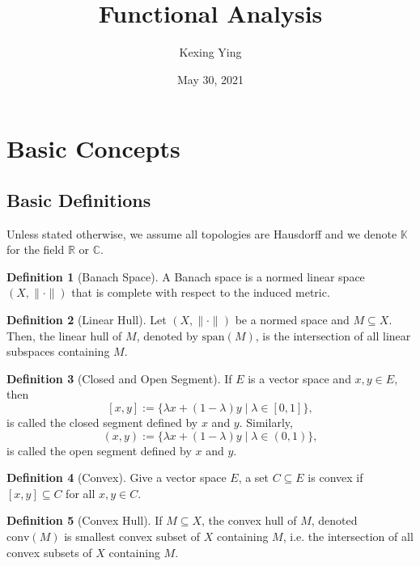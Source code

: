 \documentclass[
]{article}
\title{Functional Analysis}
\author{Kexing Ying}
\date{May 30, 2021}
\theoremstyle{definition}
\theoremstyle{definition}
\newtheorem{definition}{Definition}[section]
\begin{document}
\maketitle

{
\hypersetup{linkcolor=}
\setcounter{tocdepth}{2}
\tableofcontents
}
\newpage

\section{Basic Concepts}

\subsection{Basic Definitions}

Unless stated otherwise, we assume all topologies are Hausdorff and we denote 
\(\mathbb{K}\) for the field \(\mathbb{R}\) or \(\mathbb{C}\).

\begin{definition}[Banach Space]
  A Banach space is a normed linear space \((X, \|\cdot\|)\) that is complete 
  with respect to the induced metric.
\end{definition}

\begin{definition}[Linear Hull]
  Let \((X, \|\cdot\|)\) be a normed space and \(M \subseteq X\). Then, the 
  linear hull of \(M\), denoted by \(\text{span}(M)\), is the intersection of 
  all linear subspaces containing \(M\).
\end{definition}

\begin{definition}[Closed and Open Segment]
  If \(E\) is a vector space and \(x, y \in E\), then 
  \[[x, y] := \{\lambda x + (1 - \lambda) y \mid \lambda \in [0, 1]\},\] 
  is called the closed segment defined by \(x\) and \(y\). Similarly, 
  \[(x, y) := \{\lambda x + (1 - \lambda) y \mid \lambda \in (0, 1)\},\] 
  is called the open segment defined by \(x\) and \(y\).
\end{definition}

\begin{definition}[Convex]
  Give a vector space \(E\), a set \(C \subseteq E\) is convex if 
  \([x, y] \subseteq C\) for all \(x, y \in C\).
\end{definition}

\begin{definition}[Convex Hull]
  If \(M \subseteq X\), the convex hull of \(M\), denoted \(\text{conv}(M)\) is 
  smallest convex subset of \(X\) containing \(M\), i.e. the intersection of 
  all convex subsets of \(X\) containing \(M\).
\end{definition}
\end{document}
